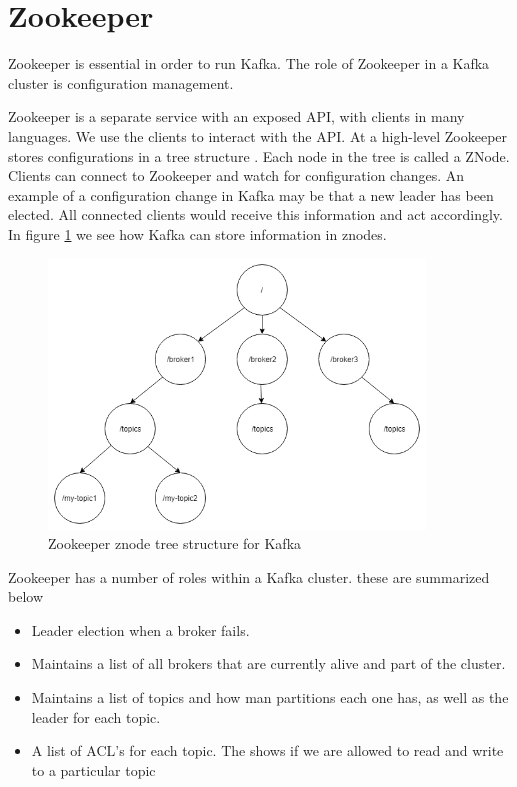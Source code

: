 \section{Zookeeper}

Zookeeper is essential in order to run Kafka. The role of Zookeeper in a Kafka cluster is configuration management. 
	
Zookeeper is a separate service with an exposed API, with clients in many languages. We use the clients to interact with the API. At a high-level Zookeeper stores configurations in a tree structure \cite{hunt2010zookeeper}. Each node in the tree is called a ZNode. Clients can connect to Zookeeper and watch for configuration changes. An example of a configuration change in Kafka may be that a new leader has been elected. All connected clients would receive this information and act accordingly. In figure \ref{fig:zookeeper-znodes} we see how Kafka can store information in znodes.

\begin{figure}[H]
  \centering
  \includegraphics[scale=0.5,width=100mm]{./images/zookeeper-znodes.png}
  \caption{Zookeeper znode tree structure for Kafka}
  \label{fig:zookeeper-znodes}
\end{figure}

Zookeeper has a number of roles within a Kafka cluster. these are summarized below

\begin{itemize}
  \item Leader election when a broker fails.
  \item Maintains a list of all brokers that are currently alive and part of the cluster.
  \item Maintains a list of topics and how man partitions each one has, as well as the leader for each topic.
  \item A list of ACL's for each topic. The shows if we are allowed to read and write to a particular topic
\end{itemize}